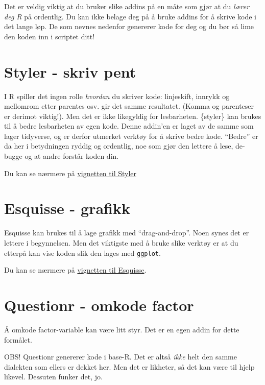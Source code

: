 \documentclass[
  norsk,
  letterpaper,
  DIV=11,
  numbers=noendperiod]{scrreprt}
\theoremstyle{definition}
\theoremstyle{remark}
\begin{document}
Det er veldig viktig at du bruker slike addins på en måte som gjør at du
\emph{lærer deg R} på ordentlig. Du kan ikke belage deg på å bruke
addins for å skrive kode i det lange løp. De som nevnes nedenfor
genererer kode for deg og du bør så lime den koden inn i scriptet ditt!

\section{Styler - skriv pent}\label{styler---skriv-pent}

I R spiller det ingen rolle \emph{hvordan} du skriver kode: linjeskift,
innrykk og mellomrom etter parentes osv. gir det samme resultatet.
(Komma og parenteser er derimot viktig!). Men det er ikke likegyldig for
lesbarheten. \{styler\} kan brukes til å bedre lesbarheten av egen kode.
Denne addin'en er laget av de samme som lager tidyverse, og er derfor
utmerket verktøy for å skrive bedre kode. ``Bedre'' er da her i
betydningen ryddig og ordentlig, noe som gjør den lettere å lese,
de-bugge og at andre forstår koden din.

Du kan se nærmere på
\href{https://www.tidyverse.org/blog/2017/12/styler-1.0.0/}{vignetten
til Styler}

\section{Esquisse - grafikk}\label{esquisse---grafikk}

Esquisse kan brukes til å lage grafikk med ``drag-and-drop''. Noen synes
det er lettere i begynnelsen. Men det viktigste med å bruke slike
verktøy er at du etterpå kan vise koden slik den lages med
\texttt{ggplot}.

Du kan se nærmere på
\href{https://cran.r-project.org/web/packages/esquisse/vignettes/get-started.html}{vignetten
til Esquisse}.

\section{Questionr - omkode factor}\label{questionr---omkode-factor}

Å omkode factor-variable kan være litt styr. Det er en egen addin for
dette formålet.

OBS! Questionr genererer kode i base-R. Det er altså \emph{ikke} helt
den samme dialekten som ellers er dekket her. Men det er likheter, så
det kan være til hjelp likevel. Dessuten funker det, jo.
\end{document}
